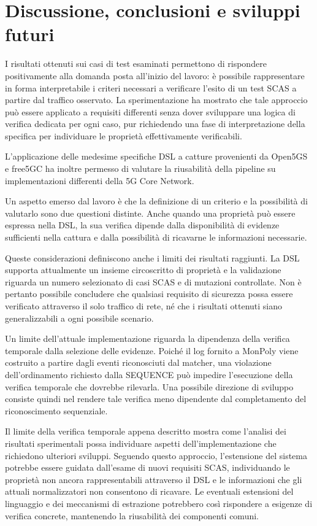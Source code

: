 \chapter{Discussione, conclusioni e sviluppi futuri}\label{discussione-conclusioni-e-sviluppi-futuri}

I risultati ottenuti sui casi di test esaminati permettono di rispondere positivamente alla domanda posta all'inizio del lavoro: è possibile rappresentare in forma interpretabile i criteri necessari a verificare l'esito di un test SCAS a partire dal traffico osservato. La sperimentazione ha mostrato che tale approccio può essere applicato a requisiti differenti senza dover sviluppare una logica di verifica dedicata per ogni caso, pur richiedendo una fase di interpretazione della specifica per individuare le proprietà effettivamente verificabili.

L'applicazione delle medesime specifiche DSL a catture provenienti da Open5GS e free5GC ha inoltre permesso di valutare la riusabilità della pipeline su implementazioni differenti della 5G Core Network.

Un aspetto emerso dal lavoro è che la definizione di un criterio e la possibilità di valutarlo sono due questioni distinte. Anche quando una proprietà può essere espressa nella DSL, la sua verifica dipende dalla disponibilità di evidenze sufficienti nella cattura e dalla possibilità di ricavarne le informazioni necessarie.

Queste considerazioni definiscono anche i limiti dei risultati raggiunti. La DSL supporta attualmente un insieme circoscritto di proprietà e la validazione riguarda un numero selezionato di casi SCAS e di mutazioni controllate. Non è pertanto possibile concludere che qualsiasi requisito di sicurezza possa essere verificato attraverso il solo traffico di rete, né che i risultati ottenuti siano generalizzabili a ogni possibile scenario.

Un limite dell'attuale implementazione riguarda la dipendenza della verifica temporale dalla selezione delle evidenze. Poiché il log fornito a MonPoly viene costruito a partire dagli eventi riconosciuti dal matcher, una violazione dell'ordinamento richiesto dalla SEQUENCE può impedire l'esecuzione della verifica temporale che dovrebbe rilevarla. Una possibile direzione di sviluppo consiste quindi nel rendere tale verifica meno dipendente dal completamento del riconoscimento sequenziale.

Il limite della verifica temporale appena descritto mostra come l'analisi dei risultati sperimentali possa individuare aspetti dell'implementazione che richiedono ulteriori sviluppi. Seguendo questo approccio, l'estensione del sistema potrebbe essere guidata dall'esame di nuovi requisiti SCAS, individuando le proprietà non ancora rappresentabili attraverso il DSL e le informazioni che gli attuali normalizzatori non consentono di ricavare. Le eventuali estensioni del linguaggio e dei meccanismi di estrazione potrebbero così rispondere a esigenze di verifica concrete, mantenendo la riusabilità dei componenti comuni.

